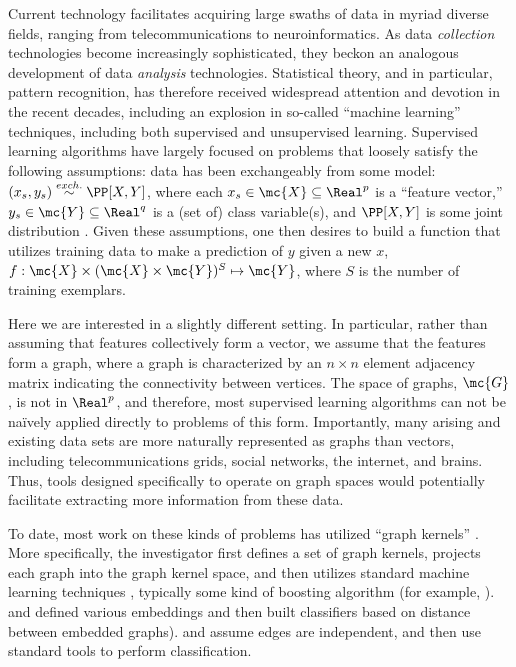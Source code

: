 Current technology facilitates acquiring large swaths of data in myriad diverse fields, ranging from telecommunications to neuroinformatics. As  data \emph{collection} technologies become increasingly sophisticated,  they beckon an analogous development of data \emph{analysis} technologies.  Statistical theory, and in particular, pattern recognition, has therefore received widespread attention and devotion in the recent decades, including an explosion in so-called ``machine learning'' techniques, including both supervised and unsupervised learning.  Supervised learning algorithms have largely focused on problems that loosely satisfy the following assumptions: data has been exchangeably from some model: $(x_s,y_s) \overset{exch.}{\sim} \PP[X,Y]$, where each $x_s \in \mc{X} \subseteq \Real^p$ is a ``feature vector,'' $y_s \in \mc{Y} \subseteq\Real^q$ is a (set of) class variable(s), and $\PP[X,Y]$ is some joint distribution \cite{DGL96}.  Given these assumptions, one then desires to build a function that utilizes training data to make a prediction of $y$ given a new $x$, $f: \mc{X} \times (\mc{X} \times \mc{Y})^S \mapsto \mc{Y}$, where $S$ is the number of training exemplars.  

Here we are interested in a slightly different setting.  In particular, rather than assuming that features collectively form a vector, we assume that the features form a graph, where a graph is characterized by an $n \times n$ element adjacency matrix indicating the connectivity between vertices.  The space of graphs, $\mc{G}$, is not in $\Real^p$, and therefore, most supervised learning algorithms can not be na\"{i}vely applied directly to problems of this form.  Importantly, many arising and existing data sets are more naturally represented as graphs than vectors, including telecommunications grids, social networks, the internet, and brains.  Thus, tools designed specifically to operate on graph spaces would potentially facilitate extracting more information from these data.

To date, most work on these kinds of problems has utilized ``graph kernels'' \cite{Gartner03}.  More specifically, the investigator first defines a set of graph kernels, projects each graph into the graph kernel space, and then utilizes standard machine learning techniques \cite{HastieFriedman01}, typically some kind of boosting algorithm \cite{FreundSchapire95} (for example, \cite{KashimaInokuchi02, KashimaInokuchi03, KudoMatsumoto04}). \cite{BunkeRiesen08} and \cite{RiesenBunke09} defined various embeddings and then built classifiers based on distance between embedded graphs). \cite{FlachLachiche04} and \cite{TrentinIorio09} assume edges are independent, and then use standard tools to perform classification.  


